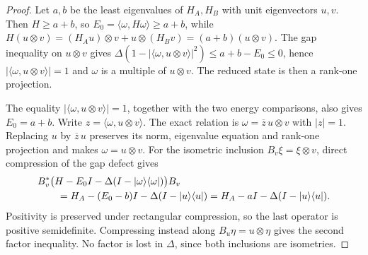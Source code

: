 \begin{proof}\leanok
    Let $a,b$ be the least eigenvalues of $H_A,H_B$ with unit eigenvectors
    $u,v$. Then $H\ge a+b$, so $E_0=\langle\omega,H\omega\rangle\ge a+b$, while
    $H(u\otimes v)=(H_Au)\otimes v+u\otimes(H_Bv)=(a+b)(u\otimes v)$. The gap inequality on $u\otimes v$ gives
    $\Delta(1-|\langle\omega,u\otimes v\rangle|^2)\le a+b-E_0\le0$, hence
    $|\langle\omega,u\otimes v\rangle|=1$ and $\omega$ is a multiple of
    $u\otimes v$. The reduced state is then a rank-one projection.

    The equality $|\langle\omega,u\otimes v\rangle|=1$, together with
    the two energy comparisons, also gives $E_0=a+b$.
    Write $z=\langle\omega,u\otimes v\rangle$.
    The exact relation is $\omega=\overline z\,u\otimes v$ with $|z|=1$.
    Replacing $u$ by $\overline z\,u$ preserves its norm, eigenvalue
    equation and rank-one projection and makes $\omega=u\otimes v$.
    For the isometric inclusion $B_v\xi=\xi\otimes v$, direct compression
    of the gap defect gives
    \begin{align}
         & B_v^*\bigl(H-E_0I-\Delta(I-|\omega\rangle\langle\omega|)\bigr)B_v
        \notag                                                               \\
         & \qquad=H_A-(E_0-b)I-\Delta(I-|u\rangle\langle u|)
        =H_A-aI-\Delta(I-|u\rangle\langle u|).\notag
    \end{align}
    Positivity is preserved under rectangular compression, so the last
    operator is positive semidefinite. Compressing instead along
    $B_u\eta=u\otimes\eta$ gives the second factor inequality.
    No factor is lost in $\Delta$, since both inclusions are isometries.
\end{proof}

